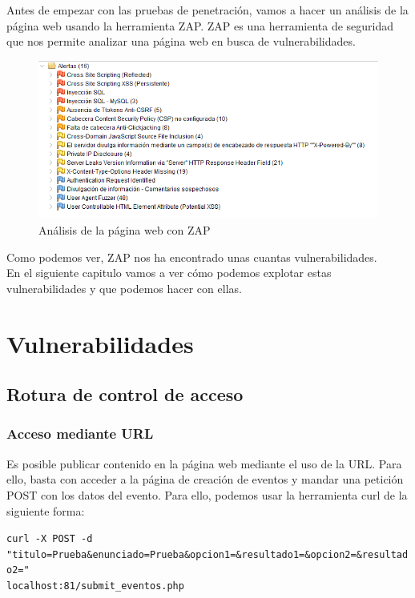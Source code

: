 \documentclass{report}
\begin{document}
        Antes de empezar con las pruebas de penetración, vamos a hacer un análisis de la página web usando la herramienta ZAP.
        ZAP es una herramienta de seguridad que nos permite analizar una página web en busca de vulnerabilidades.\\
        \begin{figure}[H]
            \centering
            \includegraphics[width=1\textwidth]{./img/introduccion/1.png}
            \caption{Análisis de la página web con ZAP}
        \end{figure}
        Como podemos ver, ZAP nos ha encontrado unas cuantas vulnerabilidades.\\
        En el siguiente capitulo vamos a ver cómo podemos explotar estas vulnerabilidades y que podemos hacer con ellas.
    \chapter{Vulnerabilidades}
        \section{Rotura de control de acceso}
            \subsection{Acceso mediante URL}
                Es posible publicar contenido en la página web mediante el uso de la URL.
                Para ello, basta con acceder a la página de creación de eventos y mandar una petición POST con los datos del evento.
                Para ello, podemos usar la herramienta curl de la siguiente forma:\\

                \begin{center}
                    \texttt{curl -X POST -d "titulo=Prueba\&enunciado=Prueba\&opcion1=\&resultado1=\&opcion2=\&resultado2="\\localhost:81/submit\_eventos.php}
                \end{center}
\end{document}
